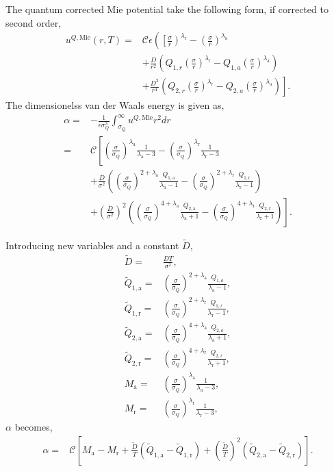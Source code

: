 \documentclass[english]{../thermomemo/thermomemo}
\newcommand*{\lb}{\left(}
\newcommand*{\rb}{\right)}
\newcommand{\mie}{\text{Mie}\xspace}
\newcommand{\lama}{\ensuremath{{\lambda_{\text{a}}}}\xspace}
\newcommand{\lamr}{\ensuremath{{\lambda_{\text{r}}}}\xspace}
\newcommand{\Dt}{\ensuremath{\tilde{D}}\xspace}
\newcommand{\Qt}{\ensuremath{\tilde{Q}}\xspace}
\newcommand{\att}{\ensuremath{\text{a}}\xspace}
\newcommand{\rep}{\ensuremath{\text{r}}\xspace}
\begin{document}
The quantum corrected Mie potential take the following form, if corrected to second order,
\begin{align}
  \label{eq:Mie_Quantum}
  u^{Q,\mie}\lb r, T\rb =& \mathcal{C}\epsilon \lb \left[\frac{\sigma}{r} \rb^\lamr - \lb\frac{\sigma}{r} \rb^\lama  \right. \nonumber \\  & + \frac{D}{r^2} \lb Q_{1,r}\lb\frac{\sigma}{r}\rb^\lamr - Q_{1,a}\lb\frac{\sigma}{r}\rb^\lama\rb \nonumber \\  &\left. + \frac{D^2}{r^4} \lb Q_{2,r}\lb\frac{\sigma}{r}\rb^\lamr - Q_{2,a}\lb\frac{\sigma}{r}\rb^\lama  \rb \right].
\end{align}
The dimensionelss van der Waals energy is given as,
\begin{align}
  \label{eq:van_der_Walls_energy}
  \alpha =& -\frac{1}{\epsilon \sigma_{Q}^3} \int_{\sigma_{Q}}^{\infty} u^{Q,\mie} r^2  dr \\
   =& \mathcal{C} \left[ \lb\frac{\sigma}{\sigma_{Q}}\rb^\lama \frac{1}{\lama - 3} - \lb\frac{\sigma}{\sigma_{Q}}\rb^\lamr\frac{1}{\lamr - 3}  \right. \nonumber \\& + \frac{D}{\sigma^2} \lb \lb\frac{\sigma}{\sigma_{Q}}\rb^{2+\lama}\frac{Q_{1,\att}}{\lama - 1} - \lb\frac{\sigma}{\sigma_{Q}}\rb^{2+\lamr}\frac{Q_{1,\rep}}{\lamr - 1}\rb \nonumber \\ &\left. + \lb\frac{D}{\sigma^2}\rb^2 \lb \lb\frac{\sigma}{\sigma_{Q}}\rb^{4+\lama}\frac{Q_{2,\att}}{\lama + 1} - \lb\frac{\sigma}{\sigma_{Q}}\rb^{4+\lamr}\frac{Q_{2,\rep}}{\lamr + 1}\rb\right].
\end{align}

Introducing new variables and a constant  $\Dt$,
\begin{align}
  \label{eq:Mie_Quantum_2}
  \Dt =& \frac{D T}{\sigma^2},\\
  \Qt_{1,\att} =& \lb\frac{\sigma}{\sigma_{Q}}\rb^{2+\lama}\frac{Q_{1,a}}{\lama - 1}, \\
  \Qt_{1,\rep} =& \lb\frac{\sigma}{\sigma_{Q}}\rb^{2+\lamr}\frac{Q_{1,r}}{\lamr - 1}, \\
  \Qt_{2,\att} =& \lb\frac{\sigma}{\sigma_{Q}}\rb^{4+\lama}\frac{Q_{2,a}}{\lama + 1}, \\
  \Qt_{2,\rep} =& \lb\frac{\sigma}{\sigma_{Q}}\rb^{4+\lamr}\frac{Q_{2,r}}{\lamr + 1}, \\
  M_{\att} =& \lb\frac{\sigma}{\sigma_{Q}}\rb^{\lama}\frac{1}{\lama - 3}, \\
  M_{\rep} =& \lb\frac{\sigma}{\sigma_{Q}}\rb^{\lamr}\frac{1}{\lamr - 3},
\end{align}
$\alpha$ becomes,
\begin{align}
  \label{eq:van_der_Walls_energy_2}
  \alpha =& \mathcal{C} \left[ M_{\att} - M_{\rep} + \frac{\Dt}{T} \lb \Qt_{1,\att} - \Qt_{1,\rep}\rb  + \lb\frac{\Dt}{T}\rb^2 \lb \Qt_{2,\att} - \Qt_{2,\rep}\rb\right].
\end{align}
\end{document}
